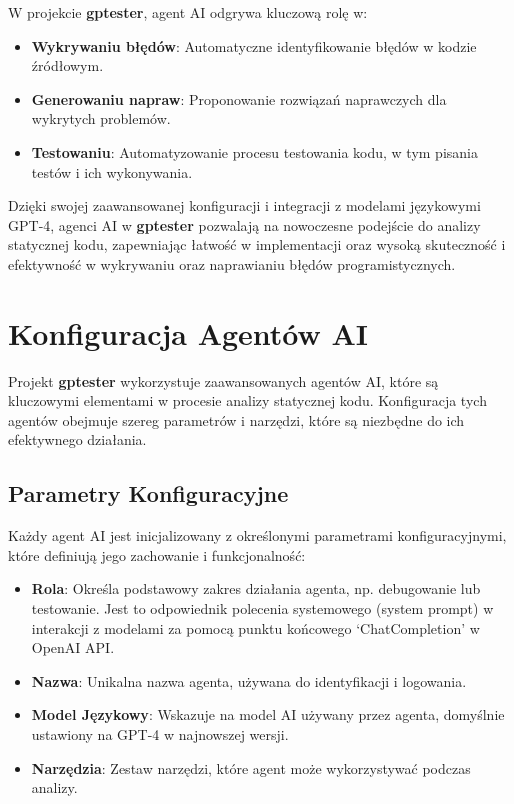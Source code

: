 W projekcie \textbf{gptester}, agent AI odgrywa kluczową rolę w:

\begin{itemize}
    \item \textbf{Wykrywaniu błędów}: Automatyczne identyfikowanie błędów w kodzie źródłowym.
    \item \textbf{Generowaniu napraw}: Proponowanie rozwiązań naprawczych dla wykrytych problemów.
    \item \textbf{Testowaniu}: Automatyzowanie procesu testowania kodu, w tym pisania testów i ich wykonywania.
\end{itemize}

Dzięki swojej zaawansowanej konfiguracji i integracji z modelami językowymi GPT-4, agenci AI w \textbf{gptester} pozwalają na nowoczesne podejście do analizy statycznej kodu, zapewniając łatwość w implementacji oraz wysoką skuteczność i efektywność w wykrywaniu oraz naprawianiu błędów programistycznych.

\section{Konfiguracja Agentów AI}
\label{subsec:konfiguracja_agentow}

Projekt \textbf{gptester} wykorzystuje zaawansowanych agentów AI, które są kluczowymi elementami w procesie analizy statycznej kodu. Konfiguracja tych agentów obejmuje szereg parametrów i narzędzi, które są niezbędne do ich efektywnego działania.

\subsection{Parametry Konfiguracyjne}

Każdy agent AI jest inicjalizowany z określonymi parametrami konfiguracyjnymi, które definiują jego zachowanie i funkcjonalność:

\begin{itemize}
    \item \textbf{Rola}: Określa podstawowy zakres działania agenta, np. debugowanie lub testowanie. Jest to odpowiednik polecenia systemowego (system prompt) w interakcji z modelami za pomocą punktu końcowego `ChatCompletion' w OpenAI API.
    \item \textbf{Nazwa}: Unikalna nazwa agenta, używana do identyfikacji i logowania.
    \item \textbf{Model Językowy}: Wskazuje na model AI używany przez agenta, domyślnie ustawiony na GPT-4 w najnowszej wersji.
    \item \textbf{Narzędzia}: Zestaw narzędzi, które agent może wykorzystywać podczas analizy.
\end{itemize}

